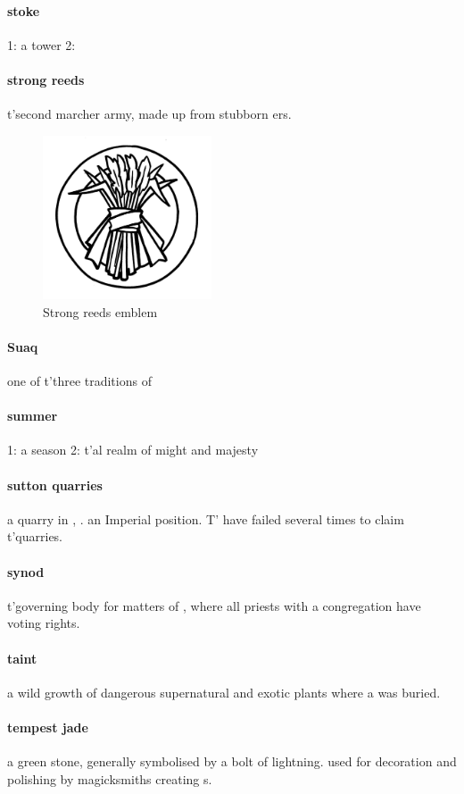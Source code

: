 \paragraph{stoke} 1: a tower 2: 
\paragraph{strong reeds} t'\allowbreak second marcher army, made up from stubborn ers.\begin{figure}\centering\includegraphics[width=5cm]{encyclopedia/StrongReeds}\caption{Strong reeds emblem}\end{figure}
\paragraph{Suaq} one of t'\allowbreak three traditions of 
\paragraph{summer} 1: a season 2: t'\allowbreak {}al realm of might and majesty
\paragraph{sutton quarries} a  quarry in , . an Imperial  position. T' have failed several times to claim t'\allowbreak quarries.
\paragraph{synod} t'\allowbreak governing body for matters of , where all priests with a congregation have voting rights.
\paragraph{taint} a wild growth of dangerous supernatural and exotic plants where a  was buried.
\paragraph{tempest jade} a green stone, generally symbolised by a bolt of lightning. used for decoration and polishing by magicksmiths creating s. 
